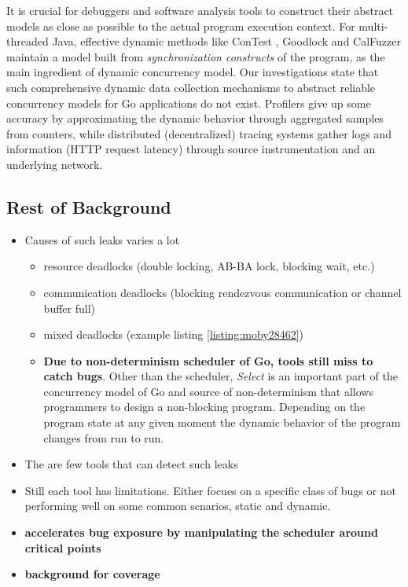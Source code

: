 It is crucial for debuggers and software analysis tools to construct their abstract models as close as possible to the actual program execution context.
%
For multi-threaded Java, effective dynamic methods like ConTest \cite{contest-jgi01}, Goodlock \cite{havelund-goodlock-spin00} and CalFuzzer \cite{joshi-calfuzzer} maintain a model built from \textit{synchronization constructs} of the program, as the main ingredient of dynamic concurrency model.
%
Our investigations state that such comprehensive dynamic data collection mechanisms to abstract reliable concurrency models for Go applications do not exist.
%
Profilers \cite{go-profile-blog} give up some accuracy by approximating the dynamic behavior through aggregated samples from counters,
%
while distributed (decentralized) tracing systems \cite{dapper} gather logs and information (\eg HTTP request latency) through source instrumentation and an underlying network.
%

%





\subsection{Rest of Background}
\begin{itemize}
  \item Causes of such leaks varies a lot
  \begin{itemize}
    \item resource deadlocks (double locking, AB-BA lock, blocking wait, etc.)
    \item communication deadlocks (blocking rendezvous communication or channel buffer full)
    \item mixed deadlocks (example listing \ref{listing:moby28462})
    \item \textbf{Due to non-determinism scheduler of Go, tools still miss to catch bugs}. Other than the scheduler, \textit{Select} is an important part of the concurrency model of Go and source of non-determinism that allows programmers to design a non-blocking program. Depending on the program state at any given moment the dynamic behavior of the program changes from run to run.
  \end{itemize}
  \item The are few tools that can detect such leaks
  \item Still each tool has limitations. Either focues on a specific class of bugs or not performing well on some common scnarios, static and dynamic.
  \item \textbf{\goat accelerates bug exposure by manipulating the scheduler around critical points}
  \item \textbf{background for coverage}
\end{itemize}
